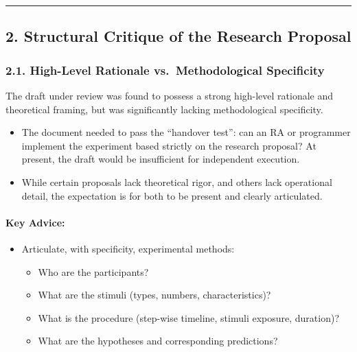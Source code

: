 \documentclass[
]{article}
\providecommand{\tightlist}{%
  \setlength{\itemsep}{0pt}\setlength{\parskip}{0pt}}
\begin{document}
\begin{center}\rule{0.5\linewidth}{0.5pt}\end{center}

\subsection{2. Structural Critique of the Research
Proposal}\label{structural-critique-of-the-research-proposal}

\subsubsection{2.1. High-Level Rationale vs.~Methodological
Specificity}\label{high-level-rationale-vs.-methodological-specificity}

The draft under review was found to possess a strong high-level
rationale and theoretical framing, but was significantly lacking
methodological specificity.

\begin{itemize}
\tightlist
\item
  The document needed to pass the ``handover test'': can an RA or
  programmer implement the experiment based strictly on the research
  proposal? At present, the draft would be insufficient for independent
  execution.
\item
  While certain proposals lack theoretical rigor, and others lack
  operational detail, the expectation is for both to be present and
  clearly articulated.
\end{itemize}

\paragraph{\texorpdfstring{\textbf{Key
Advice:}}{Key Advice:}}\label{key-advice}

\begin{itemize}
\tightlist
\item
  Articulate, with specificity, experimental methods:

  \begin{itemize}
  \tightlist
  \item
    Who are the participants?
  \item
    What are the stimuli (types, numbers, characteristics)?
  \item
    What is the procedure (step-wise timeline, stimuli exposure,
    duration)?
  \item
    What are the hypotheses and corresponding predictions?
  \end{itemize}
\end{itemize}
\end{document}
